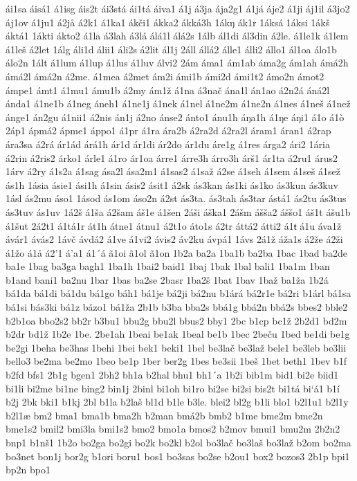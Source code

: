 ái1sa
áisá1
á1isg
áis2t
ái3stá
ái1tá
áiva1
á1j
á3ja
ája2g1
á1já
áje2
á1ji
áj1il
á3jo2
áj1ov
á1ju1
á2jå
á2k1
á1ka1
ákči1
ákka2
ákká3h
1ákŋ
ák1r
1áksá
1áksi
1ákš
áktá1
1ákti
ákto2
á1la
á3lah
á3lá
álá1l
álá2s
1álb
ál1di
ál3din
á2le.
á1le1k
á1lem
á1leš
á2let
1álg
áli1d
álii1
áli2s
á2lit
ál1j
2áll
állá2
álle1
álli2
állo1
ál1oa
álo1b
álo2n
1ált
á1lum
á1lup
á1lus
á1luv
álvi2
2ám
áma1
ám1ab
áma2g
ám1ah
ámá2h
ámá2l
ámá2n
á2me.
á1mea
á2met
ám2i
ámi1b
ámi2d
ámi1t2
ámo2n
ámot2
ámpe1
ámt1
á1mu1
ámu1b
á2my
ám1ž
á1na
á3nač
ána1l
án1ao
á2n2á
áná2l
ánda1
á1ne1b
á1neg
áneh1
á1ne1j
á1nek
á1nel
á1ne2m
á1ne2n
á1nes
á1neš
á1než
ánge1
án2gu
á1nii1
á2nis
án1j
á2no
ánse2
ánto1
ánu1h
áŋa1h
á1ŋe
áŋi1
á1o
á1ò
2áp1
ápmá2
ápme1
áppo1
á1pr
á1ra
ára2b
á2ra2d
á2ra2l
áram1
áran1
á2rap
ára3sa
á2rá
ár1ád
árá1h
ár1d
ár1di
ár2do
ár1du
áre1g
á1res
árga2
ári2
1ária
á2rin
á2ris2
árko1
árle1
á1ro
ár1oa
árre1
árre3h
árro3h
árš1
ár1ta
á2ru1
árus2
1árv
á2ry
á1s2a
á1sag
ása2l
ása2m1
á1sas2
á1saž
á2se
á1seh
á1sem
á1seš
á1sež
ás1h
1ásia
ásie1
ási1h
á1sin
ásis2
ásit1
á2sk
ás3kan
ás1ki
ás1ko
ás3kun
ás3kuv
1ásl
ás2mu
áso1
1ásod
ás1om
áso2n
á2st
ás3ta.
ás3tah
ás3tar
ástá1
ás2tu
ás3tus
ás3tuv
ás1uv
1á2š
á1ša
á2šam
áš1e
á1šen
2áši
áška1
2ášm
ášša2
áššo1
áš1t
ášu1b
á1šut
2á2t1
á1tá1r
át1h
átne1
átnu1
á2t1o
áto1s
á2tr
áttá2
átti2
á1ŧ
á1u
áva1ž
ávár1
ávás2
1ávč
ávdá2
á1ve
á1vi2
ávis2
áv2ku
ávpá1
1ávs
2á1ž
áža1s
á2že
á2ži
á1žo
á1å
á2'1
á'a1
á1´á
ã1oi
ã1ol
ã1on
1b2a
ba2a
1ba1b
ba2ba
1bac
1bad
ba2de
ba1e
1bag
ba3ga
bagh1
1ba1h
1bai2
baid1
1baj
1bak
1bal
bali1
1ba1m
1ban
b1and
bani1
ba2nu
1bar
1bas
ba2se
2basr
1ba2š
1bat
1bav
1baž
ba1ža
1b2á
bá1da
bá1di
bá1du
bá1go
báh1
bá1je
bá2ji
bá2nu
b1árá
bá2r1e
bá2ri
b1árl
bá1sa
bá1si
bás3ki
bá1z
bázo1
bá1ža
2b1b
b3ba
bba2s
bbá1g
bbá2n
bbá2s
bbes2
bble2
b2b1oa
bbo2s2
bb2r
b3bu1
bbu2g
bbu2l
bbus2
bby1
2bc
b1cp
bc1ž
2b2d1
bd2m
b2dr
bd1ž
1b2e
1be.
2be1ah
1beai
be1ak
1beal
be1b
1bec
2beču
1bed
be1di
be1g
be2gi
1beha
be3has
1behi
1bei
bek1
beki1
1bel
be3lač
be3laž
bele1
be3leb
be3lii
bello3
be2ma
be2mo
1beo
be1p
1ber
ber2g
1bes
be3sii
1beš
1bet
beth1
1bev
b1f
b2fd
bfs1
2b1g
bgen1
2bh2
bh1a
b2hal
bhu1
bh1´a
1b2i
bib1m
bid1
bi2e
biid1
bi1li
bi2me
bi1ne
bing2
bin1j
2binl
bi1oh
bi1ro
bi2se
bi2si
bis2t
bi1tá
bi`á1
b1í
b2j
2bk
bki1
b1kj
2bl
b1la
b2laš
bl1d
b1le
b3le.
blei2
bl2g
b1li
blo1
b2l1u1
b2l1y
b2l1æ
bm2
bma1
bma1b
bma2h
b2man
bmá2b
bmb2
b1me
bme2m
bme2n
bme1s2
bmil2
bmi3la
bmi1s2
bmo2
bmo1a
bmos2
b2mov
bmui1
bmu2m
2b2n2
bnp1
b1nš1
1b2o
bo2ga
bo2gi
bo2k
bo2kl
b2ol
bo3lač
bo3laš
bo3laž
b2om
bo2ma
bo3net
bon1j
bor2g
b1ori
boru1
bos1
bo3sas
bo2se
b2ou1
box2
bozos3
2b1p
bpi1
bp2n
bpo1
